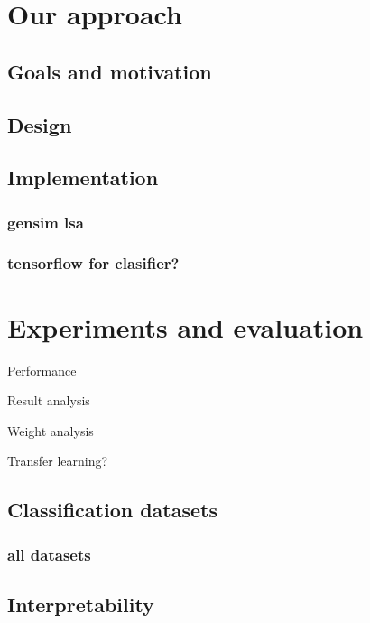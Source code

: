     
\chapter{Our approach}
    \section{Goals and motivation}
    \section{Design}
    \section{Implementation}
        \cite{bird2009natural} %
        \subsection{gensim lsa}
        \subsection{tensorflow for clasifier?}
    \*

\chapter{Experiments and evaluation}

    Performance
    
    Result analysis
    
    Weight analysis
    
    Transfer learning?

    \section{Classification datasets}
        \subsection{all datasets}
            \cite{conneau2017supervised} %

    \section{Interpretability}
        \cite{ribeiro2016should} %


